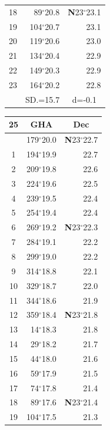 \documentclass[10pt, a4paper]{report}
\begin{document}
\begin{scriptsize}
\begin{tabular*}{0.2\textwidth}[t]{@{\extracolsep{\fill}}|c|rr|}
18 & 89$^\circ$20.8 & \textbf{N}23$^\circ$23.1\\
19 & 104$^\circ$20.7 & 23.1\\
20 & 119$^\circ$20.6 & 23.0\\
21 & 134$^\circ$20.4 & \raisebox{0.24ex}{\boldmath$\cdot$~\boldmath$\cdot$~~}22.9\\
22 & 149$^\circ$20.3 & 22.9\\
23 & 164$^\circ$20.2 & 22.8\\
\hline
\rule{0pt}{2.4ex} & \multicolumn{1}{c}{SD.=15.7} & \multicolumn{1}{c|}{d=-0.1}\\
\hline
\end{tabular*}\noindent
\begin{tabular*}{0.2\textwidth}[t]{@{\extracolsep{\fill}}|c|rr|}
\hline
\multicolumn{1}{|c|}{\rule{0pt}{2.6ex}\textbf{25}} & \multicolumn{1}{c}{\textbf{GHA}} & \multicolumn{1}{c|}{\textbf{Dec}}\\
\hline\rule{0pt}{2.6ex}\noindent
0 & 179$^\circ$20.0 & \textbf{N}23$^\circ$22.7\\
1 & 194$^\circ$19.9 & 22.7\\
2 & 209$^\circ$19.8 & 22.6\\
3 & 224$^\circ$19.6 & \raisebox{0.24ex}{\boldmath$\cdot$~\boldmath$\cdot$~~}22.5\\
4 & 239$^\circ$19.5 & 22.4\\
5 & 254$^\circ$19.4 & 22.4\\[2Pt]
6 & 269$^\circ$19.2 & \textbf{N}23$^\circ$22.3\\
7 & 284$^\circ$19.1 & 22.2\\
8 & 299$^\circ$19.0 & 22.2\\
9 & 314$^\circ$18.8 & \raisebox{0.24ex}{\boldmath$\cdot$~\boldmath$\cdot$~~}22.1\\
10 & 329$^\circ$18.7 & 22.0\\
11 & 344$^\circ$18.6 & 21.9\\[2Pt]
12 & 359$^\circ$18.4 & \textbf{N}23$^\circ$21.8\\
13 & 14$^\circ$18.3 & 21.8\\
14 & 29$^\circ$18.2 & 21.7\\
15 & 44$^\circ$18.0 & \raisebox{0.24ex}{\boldmath$\cdot$~\boldmath$\cdot$~~}21.6\\
16 & 59$^\circ$17.9 & 21.5\\
17 & 74$^\circ$17.8 & 21.4\\[2Pt]
18 & 89$^\circ$17.6 & \textbf{N}23$^\circ$21.4\\
19 & 104$^\circ$17.5 & 21.3\\

\end{tabular*}
\end{scriptsize}
\end{document}
